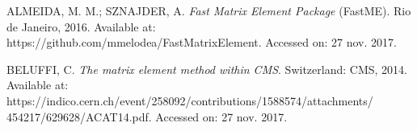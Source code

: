 \begin{thebibliography}{}
ALMEIDA, M. M.; SZNAJDER, A. \textit{Fast Matrix Element Package} (FastME). Rio de Janeiro, 2016. Available at: https://github.com/mmelodea/FastMatrixElement. Accessed on: 27 nov. 2017.

BELUFFI, C. \textit{The matrix element method within CMS}. Switzerland: CMS, 2014. Available at: https://indico.cern.ch/event/258092/contributions/1588574/attachments/ 454217/629628/ACAT14.pdf. Accessed on: 27 nov. 2017.

\end{thebibliography}
